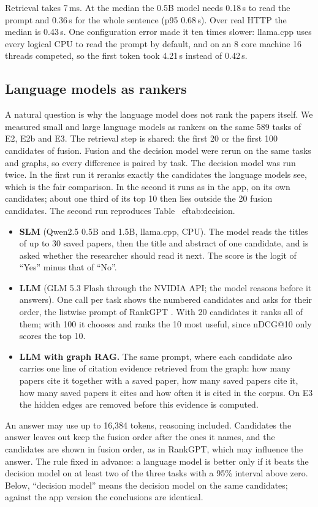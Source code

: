 \documentclass[11pt,a4paper]{article}
\begin{document}
Retrieval takes 7\,ms. At the median the 0.5B model needs 0.18\,s to read the prompt and 0.36\,s for the whole sentence (p95 0.68\,s). Over real HTTP the median is 0.43\,s. One configuration error made it ten times slower: llama.cpp uses every logical CPU to read the prompt by default, and on an 8 core machine 16 threads competed, so the first token took 4.21\,s instead of 0.42\,s.

\subsection{Language models as rankers}\label{sec:llmrank}
A natural question is why the language model does not rank the papers itself. We measured small and large language models as rankers on the same 589 tasks of E2, E2b and E3. The retrieval step is shared: the first 20 or the first 100 candidates of fusion. Fusion and the decision model were rerun on the same tasks and graphs, so every difference is paired by task. The decision model was run twice. In the first run it reranks exactly the candidates the language models see, which is the fair comparison. In the second it runs as in the app, on its own candidates; about one third of its top 10 then lies outside the 20 fusion candidates. The second run reproduces Table~
ef{tab:decision}.
\begin{itemize}
\item \textbf{SLM} (Qwen2.5 0.5B and 1.5B, llama.cpp, CPU). The model reads the titles of up to 30 saved papers, then the title and abstract of one candidate, and is asked whether the researcher should read it next. The score is the logit of ``Yes'' minus that of ``No''.
\item \textbf{LLM} (GLM 5.3 Flash through the NVIDIA API; the model reasons before it answers). One call per task shows the numbered candidates and asks for their order, the listwise prompt of RankGPT \citep{sun2023rankgpt}. With 20 candidates it ranks all of them; with 100 it chooses and ranks the 10 most useful, since nDCG@10 only scores the top 10.
\item \textbf{LLM with graph RAG.} The same prompt, where each candidate also carries one line of citation evidence retrieved from the graph: how many papers cite it together with a saved paper, how many saved papers cite it, how many saved papers it cites and how often it is cited in the corpus. On E3 the hidden edges are removed before this evidence is computed.
\end{itemize}
An answer may use up to 16,384 tokens, reasoning included. Candidates the answer leaves out keep the fusion order after the ones it names, and the candidates are shown in fusion order, as in RankGPT, which may influence the answer. The rule fixed in advance: a language model is better only if it beats the decision model on at least two of the three tasks with a 95\% interval above zero. Below, ``decision model'' means the decision model on the same candidates; against the app version the conclusions are identical.
\end{document}
